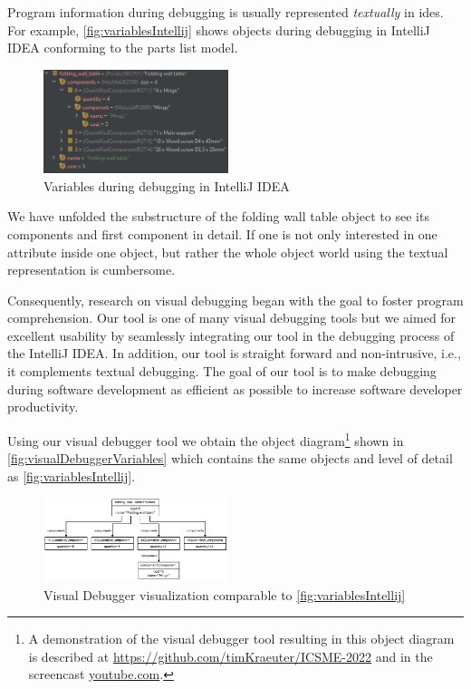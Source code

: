 \documentclass[conference]{IEEEtran}
\newcommand{\intellij}{IntelliJ IDEA}
\begin{document}
Program information during debugging is usually represented \textit{textually} in \glspl*{ide}.
For example, \autoref{fig:variablesIntellij} shows objects during debugging in \intellij{} conforming to the parts list model. 

\begin{figure}[h]
    \centering
    \includegraphics[width=0.48\textwidth]{images/variables.png}
    \caption{Variables during debugging in \intellij}
    \label{fig:variablesIntellij}
\end{figure}

We have unfolded the substructure of the \textsf{folding wall table} object to see its components and first component in detail.
If one is not only interested in one attribute inside one object, but rather the whole object world using the textual representation is cumbersome.

Consequently, research on visual debugging began with the goal to foster program comprehension.
Our tool is one of many visual debugging tools but we aimed for excellent usability by seamlessly integrating our tool in the debugging process of the \intellij{}.
In addition, our tool is straight forward and non-intrusive, i.e., it complements textual debugging.
The goal of our tool is to make debugging during software development as efficient as possible to increase software developer productivity.

Using our visual debugger tool we obtain the object diagram\footnote{A demonstration of the visual debugger tool resulting in this object diagram is described at \url{https://github.com/timKraeuter/ICSME-2022} and in the screencast \url{youtube.com}.} shown in \autoref{fig:visualDebuggerVariables} which contains the same objects and level of detail as \autoref{fig:variablesIntellij}.

\begin{figure}[h]
    \centering
    \includegraphics[width=0.48\textwidth]{images/VD-parts list object diagram.pdf}
    \caption{Visual Debugger visualization comparable to \autoref{fig:variablesIntellij}}
    \label{fig:visualDebuggerVariables}
\end{figure}
\end{document}
